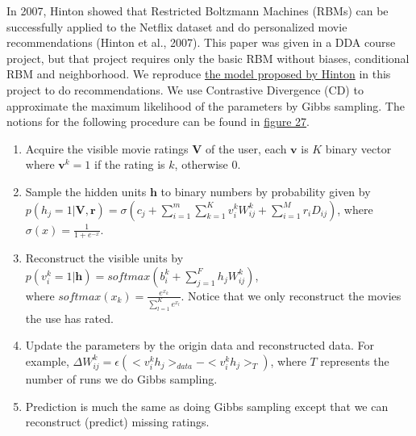 \begin{CJK*}{UTF8}{gbsn}
In 2007, Hinton showed that Restricted Boltzmann Machines (RBMs) can be successfully applied to the Netflix dataset and do personalized movie recommendations (Hinton et al., 2007). This paper was given in a DDA course project, but that project requires only the basic RBM without biases, conditional RBM and neighborhood. We reproduce \hyperref[RBM]{the model proposed by Hinton} in this project to do recommendations. We use Contrastive Divergence (CD) to approximate the maximum likelihood of the parameters by Gibbs sampling. The notions for the following procedure can be found in \href{rbm}{figure 27}.
\begin{enumerate}
    \item Acquire the visible movie ratings $ \bm{V} $ of the user, each $ \bm{v} $ is $ K $ binary vector where $ \bm{v}^k = 1 $ if the rating is $ k $, otherwise 0.
    \item Sample the hidden units $ \bm{h} $ to binary numbers by probability given by \\ $ p(h_j = 1 | \bm{V}, \bm{r}) = \sigma(c_j + \sum_{i = 1}^m \sum_{k = 1}^K v_i^k W_{ij}^k + \sum_{i = 1}^M r_i D_{ij}) $, where $ \sigma(x) = \frac{1}{1 + e^{-x}}  $.
    \item Reconstruct the visible units by $ p(v_i^k = 1 | \bm{h}) = softmax(b_i^k + \sum_{j = 1}^F h_j W_{ij}^k) $, \\where $ softmax(x_k) = \frac{e^{x_k}}{\sum_{l= 1}^K e^{x_l}} $. Notice that we only reconstruct the movies the use has rated.
    \item Update the parameters by the origin data and reconstructed data. For example, $ \Delta W_{ij}^k = \epsilon (<v_i^k h_j>_{data} - <v_i^k h_j>_T) $, where $ T $ represents the number of runs we do Gibbs sampling.
    \item Prediction is much the same as doing Gibbs sampling except that we can reconstruct (predict) missing ratings.
\end{enumerate}


\end{CJK*}
